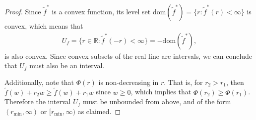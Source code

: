 \documentclass{article}
\theoremstyle{plain}
\theoremstyle{definition}
\newcommand{\R}{\mathbb{R}}
\newcommand{\ftilde}{\widetilde{f}}
\begin{document}
\begin{proof}
    Since $\ftilde^*$ is a convex function, its level set $ \mathrm{dom}(\ftilde^*) = \{r: \ftilde^*(r) < \infty\}$ is convex, which means that 
    \begin{align}
        U_f = \{r \in \R: \ftilde^*(-r) < \infty\} =   -\mathrm{dom}(\ftilde^*), 
    \end{align}
    is also convex. Since convex subsets of the real line are intervals, we can conclude that $U_f$ must also be an interval. 

    Additionally, note that $\Phi(r)$ is non-decreasing in $r$. That is, for $r_2 > r_1$, then $\ftilde(w) + r_2 w \geq \ftilde(w) + r_1 w$ since $w \geq 0$, which implies that $\Phi(r_2) \geq \Phi(r_1)$. Therefore the interval $U_f$ must be unbounded from above, and of the form $(r_{\min}, \infty)$ or $[r_{\min}, \infty)$ as claimed. 


\end{proof}
\end{document}
